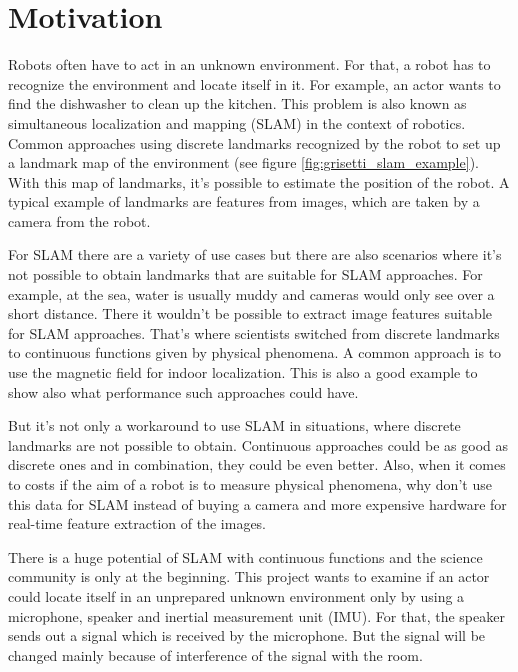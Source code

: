 \section{Motivation}

Robots often have to act in an unknown environment. For that, a robot has to recognize the environment and locate itself in it. For example, an actor wants to find the dishwasher to clean up the kitchen. This problem is also known as simultaneous localization and mapping (SLAM) in the context of robotics. Common approaches using discrete landmarks recognized by the robot to set up a landmark map of the environment (see figure \ref{fig:grisetti_slam_example}). With this map of landmarks, it's possible to estimate the position of the robot. A typical example of landmarks are features from images, which are taken by a camera from the robot.

For SLAM there are a variety of use cases but there are also scenarios where it's not possible to obtain landmarks that are suitable for SLAM approaches. For example, at the sea, water is usually muddy and cameras would only see over a short distance. There it wouldn't be possible to extract image features suitable for SLAM approaches. That's where scientists switched from discrete landmarks to continuous functions given by physical phenomena. A common approach is to use the magnetic field for indoor localization. This is also a good example to show also what performance such approaches could have.

But it's not only a workaround to use SLAM in situations, where discrete landmarks are not possible to obtain. Continuous approaches could be as good as discrete ones and in combination, they could be even better. Also, when it comes to costs if the aim of a robot is to measure physical phenomena, why don't use this data for SLAM instead of buying a camera and more expensive hardware for real-time feature extraction of the images.

There is a huge potential of SLAM with continuous functions and the science community is only at the beginning. This project wants to examine if an actor could locate itself in an unprepared unknown environment only by using a microphone, speaker and inertial measurement unit (IMU). For that, the speaker sends out a signal which is received by the microphone. But the signal will be changed mainly because of interference of the signal with the room. 

